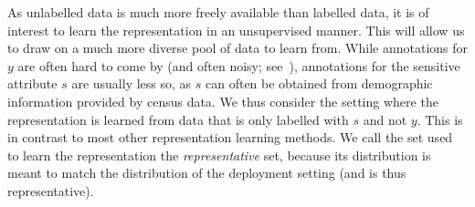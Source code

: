 As unlabelled data is much more freely available than labelled data, it is of interest to learn the representation in an unsupervised manner.
This will allow us to draw on a much more diverse pool of data to learn from.
While annotations for $y$ are often hard to come by (and often noisy; see~\cite{kehrenberg2020tuning}),
annotations for the sensitive attribute $s$ are usually less so, as $s$ can often be obtained from demographic information provided by census data.
We thus consider the setting where the representation is learned from data
that is only labelled with $s$ and not $y$.
This is in contrast to most other representation learning methods.
We call the set used to learn the representation the \emph{representative} set,
because its distribution is meant to match the distribution of the deployment setting
(and is thus representative).

